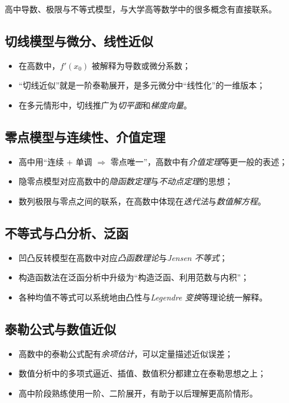 \documentclass[a4paper,11pt]{ctexart}
\begin{document}
高中导数、极限与不等式模型，与大学高等数学中的很多概念有直接联系。

\subsection{切线模型与微分、线性近似}

\begin{itemize}
  \item 在高数中，$f'(x_0)$ 被解释为导数或微分系数；
  \item “切线近似”就是一阶泰勒展开，是多元微分中“线性化”的一维版本；
  \item 在多元情形中，切线推广为\emph{切平面}和\emph{梯度向量}。
\end{itemize}

\subsection{零点模型与连续性、介值定理}

\begin{itemize}
  \item 高中用“连续 + 单调 $\Rightarrow$ 零点唯一”，高数中有\emph{介值定理}等更一般的表述；
  \item 隐零点模型对应高数中的\emph{隐函数定理}与\emph{不动点定理}的思想；
  \item 数列极限与零点之间的联系，在高数中体现在\emph{迭代法}与\emph{数值解方程}。
\end{itemize}

\subsection{不等式与凸分析、泛函}

\begin{itemize}
  \item 凹凸反转模型在高数中对应\emph{凸函数理论}与\emph{Jensen 不等式}；
  \item 构造函数法在泛函分析中升级为“构造泛函、利用范数与内积”；
  \item 各种均值不等式可以系统地由凸性与\emph{Legendre 变换}等理论统一解释。
\end{itemize}

\subsection{泰勒公式与数值近似}

\begin{itemize}
  \item 高数中的泰勒公式配有\emph{余项估计}，可以定量描述近似误差；
  \item 数值分析中的多项式逼近、插值、数值积分都建立在泰勒思想之上；
  \item 高中阶段熟练使用一阶、二阶展开，有助于以后理解更高阶情形。
\end{itemize}
\end{document}

